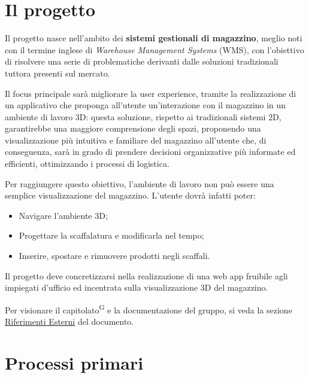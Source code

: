 \section{Il progetto}\label{sec:il_progetto}
\par Il progetto nasce nell'ambito dei \textbf{sistemi gestionali di magazzino}, meglio noti con il termine inglese di \textit{Warehouse Management Systems} (WMS), con l'obiettivo di risolvere una serie di problematiche derivanti dalle soluzioni tradizionali tuttora presenti sul mercato.
\par Il focus principale sarà migliorare la user experience, tramite la realizzazione di un applicativo che proponga all'utente un'interazione con il magazzino in un ambiente di lavoro 3D: questa soluzione, rispetto ai tradizionali sistemi 2D, garantirebbe una maggiore comprensione degli spazi, proponendo una visualizzazione più intuitiva e familiare del magazzino all'utente che, di conseguenza, sarà in grado di prendere decisioni organizzative più informate ed efficienti, ottimizzando i processi di logistica.
\par Per raggiungere questo obiettivo, l'ambiente di lavoro non può essere una semplice visualizzazione del magazzino. L'utente dovrà infatti poter:
\begin{itemize}
    \item Navigare l'ambiente 3D;
    \item Progettare la scaffalatura e modificarla nel tempo;
    \item Inserire, spostare e rimuovere prodotti negli scaffali.
\end{itemize}
Il progetto deve concretizzarsi nella realizzazione di una web app fruibile agli impiegati d'ufficio ed incentrata sulla visualizzazione 3D del magazzino.
\par Per visionare il capitolato\textsuperscript{G} e la documentazione del gruppo, si veda la sezione \hyperref[sec:riferimenti_esterni]{Riferimenti Esterni} del documento.

\newpage
\section{Processi primari}\label{sec:processi_primari}

